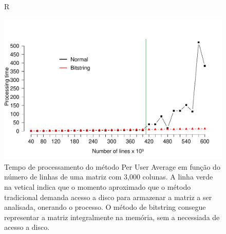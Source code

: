 \documentclass[10pt]{article}
\begin{document}
\begin{figure}[h]
{  }
  \caption{R}
  \label{fig:35363738}
\end{figure}

\begin{figure}[h]
  \centering
  \includegraphics[scale=0.6,clip]{fig39}
  \caption{Tempo de processamento do método Per User Average em função do número de linhas de uma matriz com 3,000 
colunas. A linha verde na vetical indica que o momento aproximado que o método tradicional demanda acesso a disco para 
armazenar a matriz a ser analisada, onerando o processo. O método de bitstring consegue representar a matriz 
integralmente na memória, sem a necessiada de acesso a disco.}
  \label{fig39}
\end{figure}
\end{document}
